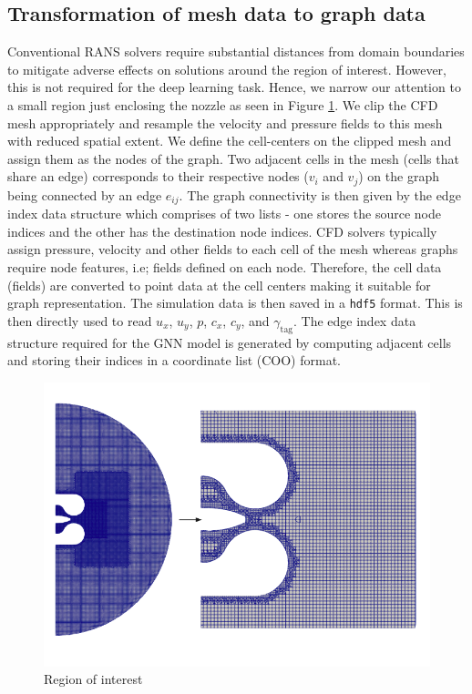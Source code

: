 \subsection{Transformation of mesh data to graph data}
Conventional RANS solvers require substantial distances from domain boundaries to mitigate adverse effects on solutions around the region of interest. However, this is not required for the deep learning task. Hence, we narrow our attention to a small region just enclosing the nozzle as seen in Figure \ref{clipmesh}. We clip the CFD mesh appropriately and resample the velocity and pressure fields to this mesh with reduced spatial extent. We define the cell-centers on the clipped mesh and assign them as the nodes of the graph. Two adjacent cells in the mesh (cells that share an edge) corresponds to their respective nodes ($v_i$ and $v_j$) on the graph being connected by an edge $e_{ij}$. The graph connectivity is then given by the edge index data structure which comprises of two lists - one stores the source node indices and the other has the destination node indices. CFD solvers typically assign pressure, velocity and other fields to each cell of the mesh whereas graphs require node features, i.e; fields defined on each node. Therefore, the cell data (fields) are converted to point data at the cell centers making it suitable for graph representation. The simulation data is then saved in a \verb|hdf5| format. This is then directly used to read $u_{x}$, $u_{y}$, $p$, $c_x$, $c_y$, and $\gamma_{\operatorname{tag}}$. The edge index data structure required for the GNN model is generated by computing adjacent cells and storing their indices in a coordinate list (COO) format. 
\begin{figure}[ht]
    \centering
    \includegraphics[width=12cm]{images/Methodology/Clipped.png}
    \caption{Region of interest}
    \label{clipmesh}
\end{figure}
